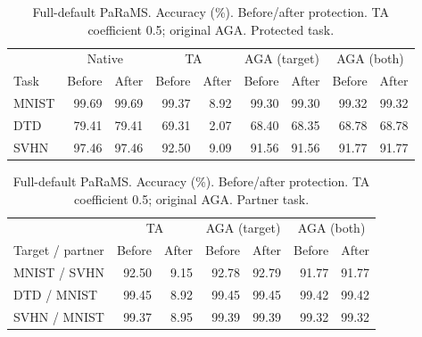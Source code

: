 \begin{table}[t]
\centering
\footnotesize
\setlength{\tabcolsep}{4pt}
\begin{tabular}{lrrrrrrrr}
\toprule
 & \multicolumn{2}{c}{Native} & \multicolumn{2}{c}{TA} & \multicolumn{2}{c}{AGA (target)} & \multicolumn{2}{c}{AGA (both)} \\
Task & Before & After & Before & After & Before & After & Before & After \\
\midrule
MNIST & 99.69 & 99.69 & 99.37 & 8.92 & 99.30 & 99.30 & 99.32 & 99.32 \\
DTD & 79.41 & 79.41 & 69.31 & 2.07 & 68.40 & 68.35 & 68.78 & 68.78 \\
SVHN & 97.46 & 97.46 & 92.50 & 9.09 & 91.56 & 91.56 & 91.77 & 91.77 \\
\bottomrule
\end{tabular}
\caption{Full-default PaRaMS. Accuracy (\%). Before/after protection. TA coefficient 0.5; original AGA. Protected task.}
\label{tab:params-target}
\end{table}

\begin{table}[t]
\centering
\footnotesize
\setlength{\tabcolsep}{4pt}
\begin{tabular}{lrrrrrr}
\toprule
 & \multicolumn{2}{c}{TA} & \multicolumn{2}{c}{AGA (target)} & \multicolumn{2}{c}{AGA (both)} \\
Target / partner & Before & After & Before & After & Before & After \\
\midrule
MNIST / SVHN & 92.50 & 9.15 & 92.78 & 92.79 & 91.77 & 91.77 \\
DTD / MNIST & 99.45 & 8.92 & 99.45 & 99.45 & 99.42 & 99.42 \\
SVHN / MNIST & 99.37 & 8.95 & 99.39 & 99.39 & 99.32 & 99.32 \\
\bottomrule
\end{tabular}
\caption{Full-default PaRaMS. Accuracy (\%). Before/after protection. TA coefficient 0.5; original AGA. Partner task.}
\label{tab:params-partner}
\end{table}
